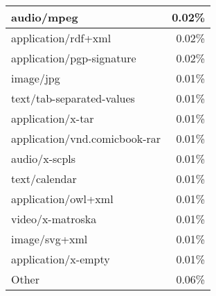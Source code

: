 \begin{center}
\begin{supertabular}[H]{l|r}
	\hline
	audio/mpeg			&	0.02\% \\
	\hline
	application/rdf+xml	&	0.02\% \\
	\hline
	application/pgp-signature		&	0.02\% \\
	\hline
	image/jpg			&	0.01\% \\
	\hline
	text/tab-separated-values		&	0.01\% \\
	\hline
	application/x-tar	&	0.01\% \\
	\hline
	application/vnd.comicbook-rar	&	0.01\% \\
	\hline
	audio/x-scpls		&	0.01\% \\
	\hline
	text/calendar		&	0.01\% \\
	\hline
	application/owl+xml	&	0.01\% \\
	\hline
	video/x-matroska	&	0.01\% \\
	\hline
	image/svg+xml		&	0.01\% \\
	\hline
	application/x-empty	&	0.01\% \\
	\hline
	Other				&	0.06\% \\
	\hline
\end{supertabular}
\end{center}

%
%
